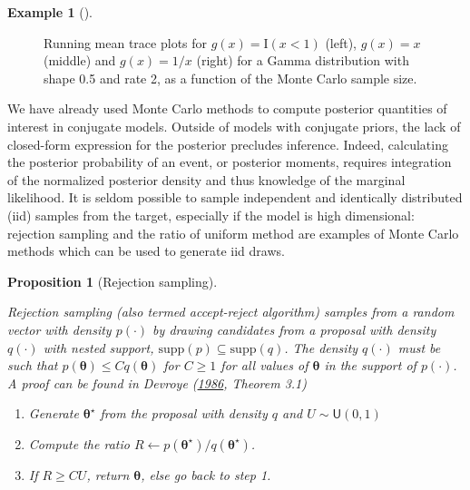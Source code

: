 \documentclass[
  11pt,
  letterpaper,
]{scrbook}
\providecommand{\tightlist}{%
  \setlength{\itemsep}{0pt}\setlength{\parskip}{0pt}}\usepackage{longtable,booktabs,array}
\theoremstyle{definition}
\newtheorem{example}{Example}[chapter]
\theoremstyle{definition}
\theoremstyle{definition}
\theoremstyle{plain}
\newtheorem{proposition}{Proposition}[chapter]
\theoremstyle{remark}
\begin{document}
\begin{example}[]
\begin{figure}[ht!]
{}

\caption{\label{fig-monte-carlo-path}Running mean trace plots for
\(g(x)=\mathrm{I}(x<1)\) (left), \(g(x)=x\) (middle) and \(g(x)=1/x\)
(right) for a Gamma distribution with shape 0.5 and rate 2, as a
function of the Monte Carlo sample size.}

\end{figure}

\end{example}

We have already used Monte Carlo methods to compute posterior quantities
of interest in conjugate models. Outside of models with conjugate
priors, the lack of closed-form expression for the posterior precludes
inference. Indeed, calculating the posterior probability of an event, or
posterior moments, requires integration of the normalized posterior
density and thus knowledge of the marginal likelihood. It is seldom
possible to sample independent and identically distributed (iid) samples
from the target, especially if the model is high dimensional: rejection
sampling and the ratio of uniform method are examples of Monte Carlo
methods which can be used to generate iid draws.

\begin{proposition}[Rejection
sampling]\protect\hypertarget{prp-rejection-sampling}{}\label{prp-rejection-sampling}

Rejection sampling (also termed accept-reject algorithm) samples from a
random vector with density \(p(\cdot)\) by drawing candidates from a
proposal with density \(q(\cdot)\) with nested support,
\(\mathrm{supp}(p) \subseteq \mathrm{supp}(q)\). The density
\(q(\cdot)\) must be such that
\(p(\boldsymbol{\theta}) \leq C q(\boldsymbol{\theta})\) for
\(C \geq 1\) for all values of \(\boldsymbol{\theta}\) in the support of
\(p(\cdot)\). A proof can be found in Devroye
(\protect\hyperlink{ref-Devroye:1986}{1986}, Theorem 3.1)

\begin{enumerate}
\def\labelenumi{\arabic{enumi}.}
\tightlist
\item
  Generate \(\boldsymbol{\theta}^{\star}\) from the proposal with
  density \(q\) and \(U \sim \mathsf{U}(0,1)\)
\item
  Compute the ratio
  \(R \gets p(\boldsymbol{\theta}^{\star})/ q(\boldsymbol{\theta}^{\star})\).
\item
  If \(R \geq CU\), return \(\boldsymbol{\theta}\), else go back to step
  1.
\end{enumerate}

\end{proposition}
\end{document}
